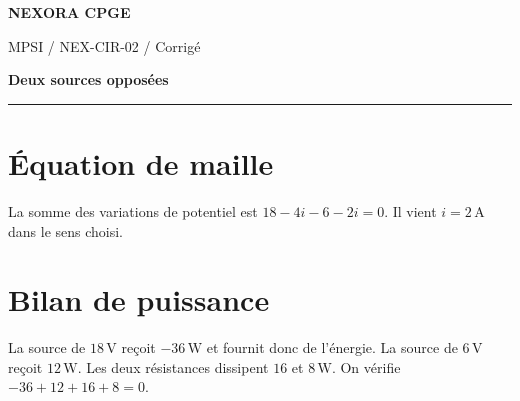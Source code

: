 \documentclass[11pt,a4paper]{article}
\begin{document}
{\small\bfseries\color{nexorablue} NEXORA CPGE}\par
{\small MPSI / NEX-CIR-02 / Corrigé}\par
{\LARGE\bfseries Deux sources opposées}\par
\vspace{0.25em}\hrule\vspace{0.6em}

\section*{Équation de maille}
La somme des variations de potentiel est $18-4i-6-2i=0$. Il vient $i=2\,\mathrm A$ dans le sens choisi.

\section*{Bilan de puissance}
La source de $18\,\mathrm V$ reçoit $-36\,\mathrm W$ et fournit donc de l’énergie. La source de $6\,\mathrm V$ reçoit $12\,\mathrm W$. Les deux résistances dissipent $16$ et $8\,\mathrm W$. On vérifie $-36+12+16+8=0$.
\end{document}
